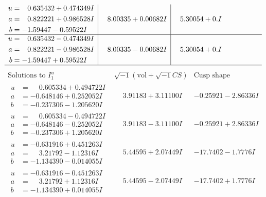 \documentclass[1p]{elsarticle_modified}
\theoremstyle{definition}
\newcommand{\I}{\sqrt{-1}}
\begin{document}
$$\begin{array}{c|c|c}
\begin{aligned}
u &= \phantom{-}0.635432 + 0.474349 I \\
a &= \phantom{-}0.822221 + 0.986528 I \\
b &= -1.59447 - 0.59522 I\end{aligned}
 & \phantom{-}8.00335 + 0.00682 I & \phantom{-}5.30054 + 0. I\phantom{ +0.000000I} \\ \hline\begin{aligned}
u &= \phantom{-}0.635432 - 0.474349 I \\
a &= \phantom{-}0.822221 - 0.986528 I \\
b &= -1.59447 + 0.59522 I\end{aligned}
 & \phantom{-}8.00335 - 0.00682 I & \phantom{-}5.30054 + 0. I\phantom{ +0.000000I}\\
 \hline 
 \end{array}$$\newpage$$\begin{array}{c|c|c}  
\text{Solutions to }I^u_{1}& \I (\text{vol} + \sqrt{-1}CS) & \text{Cusp shape}\\
 \hline 
\begin{aligned}
u &= \phantom{-}0.605334 + 0.494722 I \\
a &= -0.648146 + 0.252052 I \\
b &= -0.237306 - 1.205620 I\end{aligned}
 & \phantom{-}3.91183 + 3.11100 I & -0.25921 - 2.86336 I \\ \hline\begin{aligned}
u &= \phantom{-}0.605334 - 0.494722 I \\
a &= -0.648146 - 0.252052 I \\
b &= -0.237306 + 1.205620 I\end{aligned}
 & \phantom{-}3.91183 - 3.11100 I & -0.25921 + 2.86336 I \\ \hline\begin{aligned}
u &= -0.631916 + 0.451263 I \\
a &= \phantom{-}3.21792 - 1.12316 I \\
b &= -1.134390 - 0.014055 I\end{aligned}
 & \phantom{-}5.44595 + 2.07449 I & -17.7402 - 1.7776 I \\ \hline\begin{aligned}
u &= -0.631916 - 0.451263 I \\
a &= \phantom{-}3.21792 + 1.12316 I \\
b &= -1.134390 + 0.014055 I\end{aligned}
 & \phantom{-}5.44595 - 2.07449 I & -17.7402 + 1.7776 I \\ \hline\begin{aligned}

\end{aligned}
\end{array}$$
\end{document}
